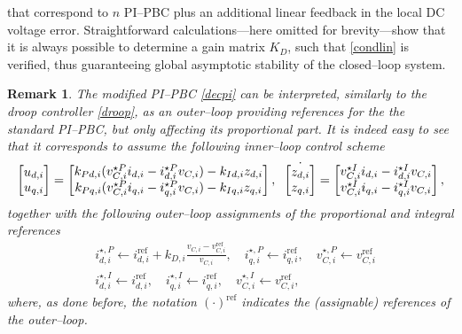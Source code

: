 \documentclass[5p,twocolumn]{elsarticle}
\def\begrem{\begin{remark}\rm}
\def\endrem{\end{remark}}
\newtheorem{remark}[theorem]{Remark}
\numberwithin{equation}{section}
\begin{document}
that correspond to $n$ PI--PBC plus an additional linear feedback in the local DC voltage error. Straightforward calculations---here omitted for brevity---show that it is always possible to determine a gain  matrix $K_D$, such that \eqref{condlin} is verified, thus guaranteeing global asymptotic stability of the closed--loop system.
\begrem
The modified PI--PBC \eqref{decpi} can be interpreted, similarly to the droop controller \eqref{droop}, as an outer--loop  providing references for the the standard PI--PBC, \textit{but only} affecting its proportional part. It is indeed easy to see that it corresponds to assume the following inner--loop control scheme
\begin{align*}\resizebox{1\hsize}{!}{$
\begin{bmatrix}
u_{d,i}\\u_{q,i}
\end{bmatrix} =\begin{bmatrix}
k_{Pd,i}(v_{C,i}^{\star P} i_{d,i}-i_{d,i}^{\star P} v_{C,i})-k_{Id,i}z_{d,i}\\
k_{Pq,i}(v_{C,i}^{\star P} i_{q,i}-i_{q,i}^{\star P} v_{C,i})-k_{Iq,i}z_{q,i}
\end{bmatrix},\;\;
\dot{\begin{bmatrix}
z_{d,i}\\
z_{q,i}
\end{bmatrix}}=\begin{bmatrix}
v_{C,i}^{\star I} i_{d,i}-i_{d,i}^{\star I} v_{C,i}\\
v_{C,i}^{\star I} i_{q,i}-i_{q,i}^{\star I} v_{C,i}
\end{bmatrix},$}
\end{align*}
together with the following outer--loop assignments of the proportional and integral references
\begin{equation}\label{drooppi}
\begin{aligned}
&i_{d,i}^{\star,P}  \leftarrow i_{d,i}^{\mathrm{\mathrm{ref}}}+k_{D,i}\frac{v_{C,i}-v_{C,i}^{\mathrm{ref}}}{v_{C,i}},\quad i_{q,i}^{\star,P}  \leftarrow i_{q,i}^{\mathrm{ref}},\quad v_{C,i}^{\star,P} \leftarrow v_{C,i}^{\mathrm{ref}}\\
&i_{d,i}^{\star,I}  \leftarrow i_{d,i}^{\mathrm{ref}},\quad i_{q,i}^{\star,I}  \leftarrow i_{q,i}^{\mathrm{ref}},\quad v_{C,i}^{\star,I} \leftarrow v_{C,i}^{\mathrm{ref}},
\end{aligned}
\end{equation}
where, as done before, the notation $(\cdot)^{\mathrm{ref}}$ indicates the (assignable) references of the outer--loop.
\endrem
\end{document}
